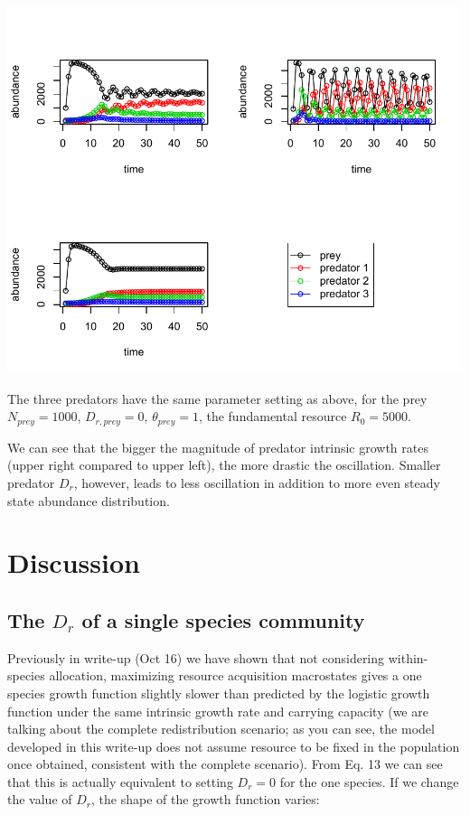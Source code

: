 \documentclass[12pt]{article}
\begin{document}
\includegraphics[width=\textwidth]{integrated_multi_predators.pdf}

\begin{center}
The three predators have the same parameter setting as above, for the prey $N_{prey}=1000$, $D_{r,prey}=0$, $\theta_{prey}=1$, the fundamental resource $R_0= 5000$.
\end{center}

We can see that the bigger the magnitude of predator intrinsic growth rates (upper right compared to upper left), the more drastic the oscillation. Smaller predator $D_r$, however, leads to less oscillation in addition to more even steady state abundance distribution.

\section{Discussion}
\subsection{The $D_r$ of a single species community}
Previously in write-up (Oct 16) we have shown that not considering within-species allocation, maximizing resource acquisition macrostates gives a one species growth function slightly slower than predicted by the logistic growth function under the same intrinsic growth rate and carrying capacity (we are talking about the complete redistribution scenario; as you can see, the model developed in this write-up does not assume resource to be fixed in the population once obtained, consistent with the complete scenario). From Eq. 13 we can see that this is actually equivalent to setting $D_r=0$ for the one species. If we change the value of $D_r$, the shape of the growth function varies:
\end{document}
